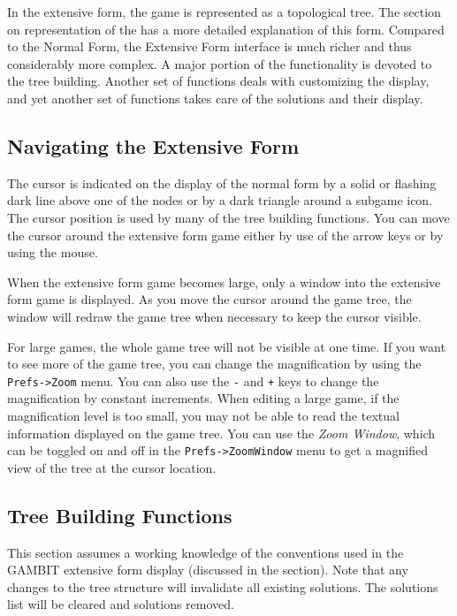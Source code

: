 In the extensive form, the game is represented as a topological tree.  The 
section on representation of the  
has a more detailed explanation of this form.
Compared to the Normal Form, the Extensive Form interface is much richer
and thus considerably more complex.  A major portion of the functionality
is devoted to the tree building.  Another set of functions deals with
customizing the display, and yet another set of functions takes care of
the solutions and their display.  

\subsection{Navigating the Extensive Form}
The cursor is indicated on the display of the normal form by a 
solid or flashing dark line above 
one of the nodes or by a dark triangle around a subgame icon. 
The cursor position is used by many of the tree building functions.  
You can move the cursor around the extensive form game 
either by use of the arrow keys or by using the mouse.  

When the extensive form 
game becomes large, only a window into the extensive form game is displayed.  
As you move the cursor around the game tree, the window will redraw 
the game tree when necessary to keep the cursor visible. 

For large games, the whole game tree will not be visible at one time.  If you 
want to see more of the game tree, you can change the magnification by 
using the {\tt Prefs->Zoom} menu.  You can also use the \verb+-+ and 
\verb&+& keys to change the magnification by constant increments. When 
editing a large game, if the magnification level is too small, you may 
not be able to read the textual information displayed on the game tree.  You 
can use the {\em Zoom Window}, which can be toggled on and off in the 
{\tt Prefs->ZoomWindow} menu to get a magnified view of the tree 
at the cursor location.  

\subsection{Tree Building Functions}
This section assumes a working knowledge of the conventions used in the
GAMBIT extensive form display (discussed in the 
 section). Note that any changes to
the tree structure will invalidate all existing solutions.  The solutions
list will be cleared and solutions removed.

